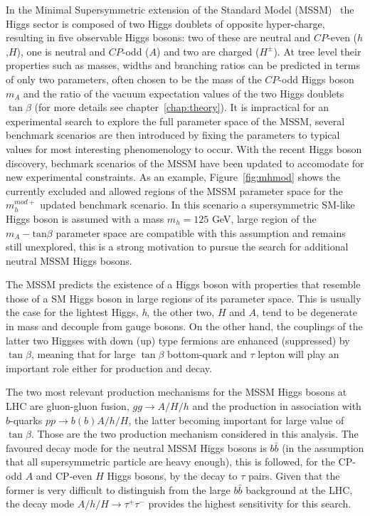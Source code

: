 In the Minimal Supersymmetric extension of the Standard Model
(MSSM)~\cite{MSSM1, MSSM2} the Higgs sector is composed of two Higgs
doublets of opposite hyper-charge, resulting in five observable Higgs
bosons:  two of these are neutral and $CP$-even
($h$,$H$), one is neutral and $CP$-odd ($A$) and two are charged
($H^\pm$).  At tree level their properties such as masses, widths and
branching ratios can be predicted in terms of only two parameters,
often chosen to be the mass of the $CP$-odd Higgs boson $m_A$ and
the ratio of the vacuum expectation values of the two Higgs doublets
$\tan\beta$ (for more details see chapter~\ref{chap:theory}).  
It is impractical
for an experimental  search to explore the full parameter space of the MSSM, several benchmark scenarios are then 
introduced by fixing the parameters to typical values for most interesting phenomenology to occur.
With the recent Higgs boson discovery, bechmark scenarios of the MSSM have been updated to 
accomodate for  new experimental constraints. 
As an example, Figure~\ref{fig:mhmod} shows the currently excluded and allowed regions of the MSSM parameter space
for the  $m_{h}^{mod+}$ updated benchmark scenario. In this scenario a supersymmetric SM-like Higgs boson 
is assumed with a mass $m_h = 125$ GeV, large region of the $m_{A} - \text{tan}\beta$ parameter space 
are compatible with this assumption and remains still unexplored, this is a strong motivation to 
pursue the search for additional neutral MSSM Higgs bosons.

The MSSM predicts the existence of a Higgs boson with properties that  
resemble those of a SM Higgs boson in large regions of its parameter space. 
This is usually the case for the lightest Higgs, \emph{h}, the other two, $H$ and $A$, 
tend to be degenerate in mass and decouple from gauge bosons.
On the other hand, the couplings of the latter two Higgses with down (up) type fermions are enhanced
(suppressed) by $\tan\beta$, meaning that for large $\tan\beta$
bottom-quark and $\tau$ lepton will play an important role either for production and decay. 
 
The two most relevant production mechanisms for the MSSM
Higgs bosons at LHC are gluon-gluon fusion, $gg\rightarrow A/H/h$ and 
the production in association with $b$-quarks $pp \rightarrow b(b)A/h/H$, the latter becoming
important for large value of $\tan\beta$. Those are the two production mechanism
considered in this analysis. 
The favoured decay mode for the neutral MSSM Higgs bosons  is $b\bar{b}$ (in the assumption that all supersymmetric particle
are heavy enough), this is followed, for the CP-odd $A$ and CP-even $H$ Higgs bosons, 
by the decay to $\tau$ pairs. Given that the former is very difficult to distinguish from the large $b\bar{b}$
background at the LHC, the decay mode $A/h/H \rightarrow \tau^+ \tau^-$  provides the highest sensitivity for this search.

